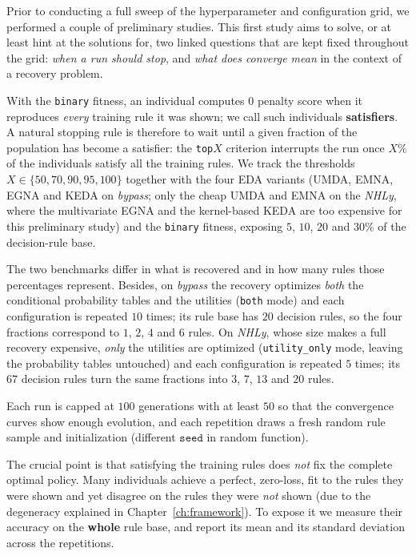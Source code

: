Prior to conducting a full sweep of the hyperparameter and configuration grid, we performed a couple of preliminary studies. This first study aims to solve, or at least hint at the solutions for, two linked questions that are kept fixed throughout the grid: \emph{when a run should stop}, and \emph{what does converge mean} in the context of a recovery problem.

With the \texttt{binary} fitness, an individual computes 0 penalty score when it reproduces \emph{every} training rule it was shown; we call such individuals \textbf{satisfiers}. A natural stopping rule
is therefore to wait until a given fraction of the population has become a
satisfier: the \texttt{top}$X$ criterion interrupts the run once $X\%$ of the
individuals satisfy all the training rules. We track the thresholds
$X\in\{50,70,90,95,100\}$ together with the four EDA variants (UMDA, EMNA, EGNA
and KEDA on \emph{bypass}; only the cheap UMDA and EMNA on the
\emph{NHLy}, where the multivariate EGNA and the kernel-based KEDA are
too expensive for this preliminary study) and the \texttt{binary}
fitness, exposing $5$, $10$, $20$ and $30\%$ of the decision-rule base. 

The two
benchmarks differ in what is recovered and in how many rules those percentages represent. Besides, on \emph{bypass} the recovery optimizes \emph{both} the conditional
probability tables and the utilities (\texttt{both} mode) and each configuration is repeated $10$ times; its rule base has $20$ decision rules, so the four fractions correspond to $1$, $2$, $4$ and $6$ rules. On \emph{NHLy}, whose size makes a full recovery expensive, \emph{only} the utilities are
optimized (\texttt{utility\_only} mode, leaving the probability tables
untouched) and each configuration is repeated $5$ times; its $67$ decision
rules turn the same fractions into $3$, $7$, $13$ and $20$ rules.

Each run is
capped at $100$ generations with at least $50$ so that the convergence curves
show enough evolution, and each repetition draws a fresh random rule sample and
initialization (different $\texttt{seed}$ in random function).

The crucial point is that satisfying the training rules does \emph{not} fix the complete optimal policy. Many individuals achieve a perfect, zero-loss, fit to the
rules they were shown and yet disagree on the rules they were
\emph{not} shown (due to the degeneracy explained in
Chapter~\ref{ch:framework}). To expose it we measure their accuracy on the \textbf{whole} rule base, and report its mean and its standard deviation across the repetitions.

